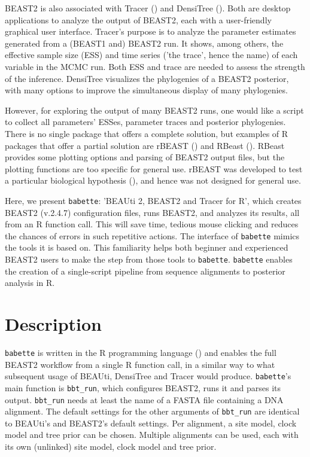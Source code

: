 \documentclass{article}
\begin{document}
BEAST2 is also associated with Tracer (\cite{tracer}) and 
DensiTree (\cite{DensiTree}). Both are desktop applications 
to analyze the output of BEAST2, each with a user-friendly graphical user interface. 
Tracer's purpose is to analyze the parameter estimates generated
from a (BEAST1 and) BEAST2 run. It shows, among
others, the effective sample size (ESS) and time series ('the trace', 
hence the name) of each variable in the MCMC run. Both ESS and trace
are needed to assess the strength of the inference. 
DensiTree visualizes the phylogenies of a BEAST2 posterior, with
many options to improve the simultaneous display of many phylogenies.

However, for exploring the output of many BEAST2 runs, one would like a
script to collect all parameters' ESSes, parameter traces and posterior
phylogenies. There is no single package that offers a complete solution,
but examples of R packages that offer a partial solution are rBEAST
(\cite{rBEAST_ratmann}) and RBeast (\cite{RBeast_faria}). RBeast provides some
plotting options and parsing of BEAST2 output files, but the plotting
functions are too specific for general use. rBEAST was developed to test a 
particular biological hypothesis (\cite{ratmann2016}), 
and hence was not designed for general use.

Here, we present \verb;babette;:
’BEAUti 2, BEAST2 and Tracer for R’, 
which creates BEAST2 (v.2.4.7) configuration files,
runs BEAST2, and analyzes its results,
all from an R function call. This
will save time, tedious mouse clicking and 
reduces the chances of errors in such repetitive actions.
The interface of \verb;babette; mimics the tools it
is based on. This
familiarity helps both beginner and experienced BEAST2 users 
to make the step from those tools to \verb;babette;.
\verb;babette; enables the creation of a single-script 
pipeline from sequence alignments to posterior analysis in R. 

\section{Description}

\verb;babette; is written in the R programming language (\cite{R})
and enables the full BEAST2 workflow from a single R function call,
in a similar way to what subsequent usage of BEAUti, DensiTree and Tracer would produce.
\verb;babette;'s main function is \verb;bbt_run;, which
configures BEAST2, runs it and parses its output. 
\verb;bbt_run; needs at least the name of a 
FASTA file containing a DNA alignment. 
The default settings for the other arguments of \verb;bbt_run; 
are identical to BEAUti's and BEAST2's default settings.
Per alignment, a site model, clock model and tree prior can be chosen.
Multiple alignments can be used, each with its own (unlinked) site model, 
clock model and tree prior.
\end{document}
